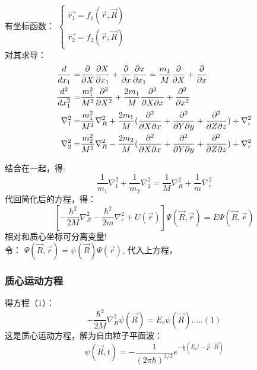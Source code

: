 \begin{frame}
	有坐标函数：
	$\displaystyle \begin{cases}
		\vec{r_1}= f_1(\vec{r},\vec{R}) \\
		\vec{r_2}= f_2(\vec{r},\vec{R}) 
	\end{cases}$ \\	
	对其求导：
	\begin{equation*}
		\begin{split}
		\dfrac{d}{dx_1}= &\dfrac{\partial}{\partial X}  \dfrac{\partial X}{ \partial x_1} +\dfrac{\partial }{\partial x}  \dfrac{\partial x}{\partial x_1} 
		= \dfrac{m_1}{M}  \dfrac{\partial }{ \partial X} +\dfrac{\partial }{\partial x} \\ \vspace{0.3em}
		\dfrac{d^2}{dx^2 _1}= &\dfrac{m^2 _1}{M^2 }  \dfrac{\partial^2 }{ \partial X^2} + \dfrac{2m _1}{M }  \dfrac{\partial^2 }{ \partial X \partial x}+\dfrac{\partial ^2 }{\partial x^2} \\		
		\nabla ^2 _1= &\dfrac{m^2 _1}{M^2 }  \nabla ^2 _R + \dfrac{2m _1}{M }  (\dfrac{\partial^2 }{ \partial X \partial x} +  \dfrac{\partial^2 }{ \partial Y \partial y} + \dfrac{\partial^2 }{ \partial Z \partial z})    + \nabla ^2 _r  \\
		\nabla ^2 _2= &\dfrac{m^2 _2}{M^2 }  \nabla ^2 _R - \dfrac{2m _2}{M }  (\dfrac{\partial^2 }{ \partial X \partial x} +  \dfrac{\partial^2 }{ \partial Y \partial y} + \dfrac{\partial^2 }{ \partial Z \partial z})    + \nabla ^2 _r
		\end{split}
	\end{equation*}
\end{frame}		

\begin{frame}
	结合在一起，得:	
	\begin{equation*}
		\dfrac{1}{m_1}\nabla ^2 _1	+ \dfrac{1}{m_2}\nabla ^2 _2 = \dfrac{1}{M}\nabla ^2 _R+ \dfrac{1}{m}\nabla ^2 _r
	\end{equation*}	
	代回简化后的方程，得：
	\begin{equation*}
		\left[-\frac{\hbar^2}{2 M} \nabla_R ^2  -\frac{\hbar^2}{2 m} \nabla_r ^2 +U(\vec{r} ) \right] \Psi (\vec{R},\vec{r}) =E \Psi (\vec{R},\vec{r}) 
	\end{equation*}
	相对和质心坐标可分离变量! \\ 
	令： $\Psi (\vec{R},\vec{r}) = \psi (\vec{R}) \Psi (\vec{r})  $, 代入上方程，
\end{frame}		

\begin{frame}
	\frametitle{质心运动方程}
	得方程（1）：
	\begin{equation*}
		-\frac{\hbar^2}{2 M} \nabla_R ^2  \psi (\vec{R}) =E_c \psi (\vec{R})  ..... (1)
	\end{equation*}	
	这是质心运动方程，解为自由粒子平面波：
	\begin{equation*}
	\psi (\vec{R},t)=-\frac{1}{(2\pi\hbar)^{3/2}}e^{-\frac{i}{\hbar}(E_c t -\vec{p}\cdot\vec{R})}
	\end{equation*}
\end{frame}		

